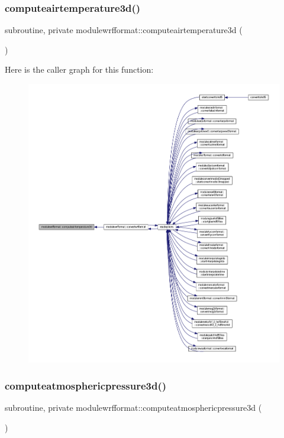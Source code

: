 \subsubsection{\texorpdfstring{computeairtemperature3d()}{computeairtemperature3d()}}
{\footnotesize\ttfamily subroutine, private modulewrfformat\+::computeairtemperature3d (\begin{DoxyParamCaption}{ }\end{DoxyParamCaption})\hspace{0.3cm}{\ttfamily [private]}}

Here is the caller graph for this function\+:\nopagebreak
\begin{figure}[H]
\begin{center}
\leavevmode
\includegraphics[width=350pt]{namespacemodulewrfformat_a73668be1d5f33f4ede49ed82d12aa794_icgraph}
\end{center}
\end{figure}
\mbox{\label{namespacemodulewrfformat_a58297fbd73eaef7ca87327428170f1aa}} 
\subsubsection{\texorpdfstring{computeatmosphericpressure3d()}{computeatmosphericpressure3d()}}
{\footnotesize\ttfamily subroutine, private modulewrfformat\+::computeatmosphericpressure3d (\begin{DoxyParamCaption}{ }\end{DoxyParamCaption})\hspace{0.3cm}{\ttfamily [private]}}

